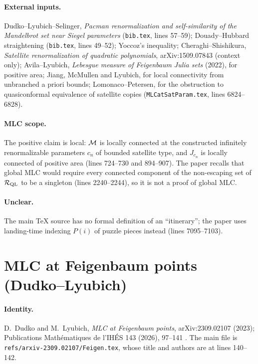 \paragraph{External inputs.}
Dudko--Lyubich--Selinger, \emph{Pacman renormalization and self-similarity of the Mandelbrot set near Siegel
parameters} (\texttt{bib.tex}, lines 57--59); Douady--Hubbard straightening (\texttt{bib.tex}, lines 49--52);
Yoccoz's inequality; Cheraghi--Shishikura, \emph{Satellite renormalization of quadratic polynomials},
arXiv:1509.07843 (context only); Avila--Lyubich, \emph{Lebesgue measure of Feigenbaum Julia sets} (2022), for
positive area; Jiang, McMullen and Lyubich, for local connectivity from unbranched a priori bounds; Lomonaco--Petersen,
for the obstruction to quasiconformal equivalence of satellite copies (\texttt{MLCatSatParam.tex}, lines 6824--6828).

\paragraph{MLC scope.}
The positive claim is local: $\mathcal M$ is locally connected at the constructed infinitely renormalizable parameters
$c_n$ of bounded satellite type, and $J_{c_n}$ is locally connected of positive area (lines 724--730 and 894--907).
The paper recalls that global MLC would require every connected component of the non-escaping set of
$\mathcal R_{\rm QL}$ to be a singleton (lines 2240--2244), so it is not a proof of global MLC.

\paragraph{Unclear.}
The main TeX source has no formal definition of an ``itinerary''; the paper uses landing-time indexing $P(i)$ of
puzzle pieces instead (lines 7095--7103).

\section{MLC at Feigenbaum points (Dudko--Lyubich)}
\label{sec:dl-feigenbaum}

\paragraph{Identity.}
D.~Dudko and M.~Lyubich, \emph{MLC at Feigenbaum points}, arXiv:2309.02107 (2023); Publications
Math\'ematiques de l'IH\'ES 143 (2026), 97--141 \cite{DudkoLyubichFeigenbaum}.  The main file is
\texttt{refs/arxiv-2309.02107/Feigen.tex}, whose title and authors are at lines 140--142.

